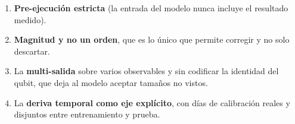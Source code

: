\begin{enumerate}
    \item \textbf{Pre-ejecución estricta} (la entrada del modelo nunca incluye el resultado medido).
    \item  \textbf{Magnitud y no un orden}, que es lo único que permite corregir y no solo descartar.
    \item  La \textbf{multi-salida} sobre varios observables y sin codificar la identidad del qubit, que deja al modelo aceptar tamaños no vistos.
    \item La \textbf{deriva temporal como eje explícito}, con días de calibración reales y disjuntos entre entrenamiento y prueba.
\end{enumerate}
